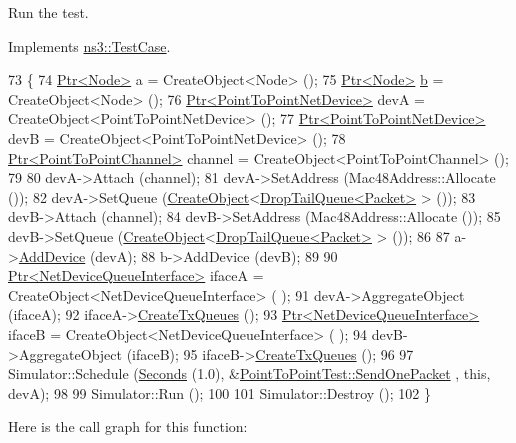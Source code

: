 Run the test. 



Implements \hyperlink{classns3_1_1TestCase_a8ff74680cf017ed42011e4be51917a24}{ns3\+::\+Test\+Case}.


\begin{DoxyCode}
73 \{
74   \hyperlink{classns3_1_1Ptr}{Ptr<Node>} a = CreateObject<Node> ();
75   \hyperlink{classns3_1_1Ptr}{Ptr<Node>} \hyperlink{buildings__pathloss_8m_a21ad0bd836b90d08f4cf640b4c298e7c}{b} = CreateObject<Node> ();
76   \hyperlink{classns3_1_1Ptr}{Ptr<PointToPointNetDevice>} devA = CreateObject<PointToPointNetDevice> ();
77   \hyperlink{classns3_1_1Ptr}{Ptr<PointToPointNetDevice>} devB = CreateObject<PointToPointNetDevice> ();
78   \hyperlink{classns3_1_1Ptr}{Ptr<PointToPointChannel>} channel = CreateObject<PointToPointChannel> ();
79 
80   devA->Attach (channel);
81   devA->SetAddress (Mac48Address::Allocate ());
82   devA->SetQueue (\hyperlink{group__object_gad1d36559be10afa72c3656fd8598c1e2}{CreateObject}<\hyperlink{classns3_1_1DropTailQueue}{DropTailQueue<Packet>} > ());
83   devB->Attach (channel);
84   devB->SetAddress (Mac48Address::Allocate ());
85   devB->SetQueue (\hyperlink{group__object_gad1d36559be10afa72c3656fd8598c1e2}{CreateObject}<\hyperlink{classns3_1_1DropTailQueue}{DropTailQueue<Packet>} > ());
86 
87   a->\hyperlink{classns3_1_1Node_a42ff83ee1d5d1649c770d3f5b62375de}{AddDevice} (devA);
88   b->AddDevice (devB);
89 
90   \hyperlink{classns3_1_1Ptr}{Ptr<NetDeviceQueueInterface>} ifaceA = CreateObject<NetDeviceQueueInterface> (
      );
91   devA->AggregateObject (ifaceA);
92   ifaceA->\hyperlink{classns3_1_1NetDeviceQueueInterface_ac5322269a36260319e3ff2767c87504f}{CreateTxQueues} ();
93   \hyperlink{classns3_1_1Ptr}{Ptr<NetDeviceQueueInterface>} ifaceB = CreateObject<NetDeviceQueueInterface> (
      );
94   devB->AggregateObject (ifaceB);
95   ifaceB->\hyperlink{classns3_1_1NetDeviceQueueInterface_ac5322269a36260319e3ff2767c87504f}{CreateTxQueues} ();
96 
97   Simulator::Schedule (\hyperlink{group__timecivil_ga33c34b816f8ff6628e33d5c8e9713b9e}{Seconds} (1.0), &\hyperlink{classPointToPointTest_a62dc99f3a74b830a62d00355801636e9}{PointToPointTest::SendOnePacket}
      , \textcolor{keyword}{this}, devA);
98 
99   Simulator::Run ();
100 
101   Simulator::Destroy ();
102 \}
\end{DoxyCode}


Here is the call graph for this function\+:



